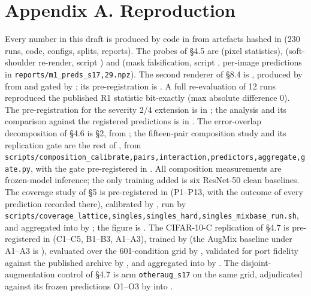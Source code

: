 \section{Appendix A. Reproduction}
Every number in this draft is produced by code in  from artefacts hashed in  (230 runs, code, configs, splits, reports). The probes of §4.5 are  (pixel statistics),  (soft-shoulder re-render, script ) and  (mask falsification, script , per-image predictions in \texttt{reports/m1\_preds\_s{17,29}.npz}). The second renderer of §8.4 is , produced by  from  and gated by ; its pre-registration is . A full re-evaluation of 12 runs reproduced the published R1 statistic bit-exactly (max absolute difference 0). The pre-registration for the severity 2/4 extension is in ; the analysis and its comparison against the registered predictions is in . The error-overlap decomposition of §4.6 is  §2, from ; the fifteen-pair composition study and its replication gate are the rest of , from \texttt{scripts/composition\_{calibrate,pairs,interaction,predictors,aggregate,gate}.py}, with the gate pre-registered in . All composition measurements are frozen-model inference; the only training added is six ResNet-50 clean baselines. The coverage study of §5 is pre-registered in  (P1--P13, with the outcome of every prediction recorded there), calibrated by , run by \texttt{scripts/coverage\_{lattice,singles,singles\_hard,singles\_mixbase}\_run.sh}, and aggregated into  by ; the figure is . The CIFAR-10-C replication of §4.7 is pre-registered in  (C1--C5, B1--B3, A1--A3), trained by  (the AugMix baseline under A1--A3 is ), evaluated over the 601-condition grid by , validated for port fidelity against the published archive by , and aggregated into  by . The disjoint-augmentation control of §4.7 is arm \texttt{otheraug\_s17} on the same grid, adjudicated against its frozen predictions O1--O3 by  into .

